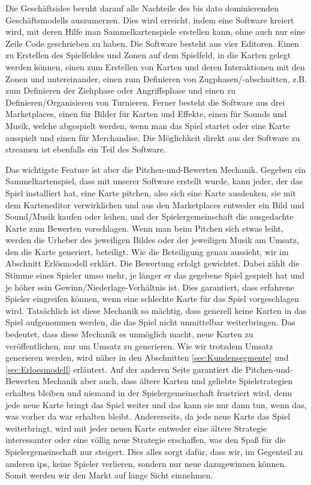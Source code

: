 \documentclass[fontsize=12, a4aper]{scrartcl}
\begin{document}
Die Geschäftsidee beruht darauf alle Nachteile des bis dato dominierenden Geschäftsmodells auszumerzen. Dies wird erreicht, indem eine Software kreiert wird, mit deren Hilfe man Sammelkartenspiele erstellen kann, ohne auch nur eine Zeile Code geschrieben zu haben. Die Software besteht aus vier Editoren. Einen zu Erstellen des Spielfeldes und Zonen auf dem Spielfeld, in die Karten gelegt werden können, einen zum Erstellen von Karten und deren Interaktionen mit den Zonen und untereinander, einen zum Definieren von Zugphasen/-abschnitten, z.B. zum Definieren der Ziehphase oder Angriffsphase und einen zu Definieren/Organisieren von Turnieren. Ferner besteht die Software aus drei Marketplaces, einen für Bilder für Karten und Effekte, einen für Sounds und Musik, welche abgespielt werden, wenn man das Spiel startet oder eine Karte ausspielt und einen für Merchandise. Die Möglichkeit direkt aus der Software zu streamen ist ebenfalls ein Teil des Software.\hfill\newline

\noindent Das wichtigste Feature ist aber die Pitchen-und-Bewerten Mechanik. Gegeben ein Sammelkartenspiel, dass mit unserer Software erstellt wurde, kann jeder, der das Spiel installiert hat, eine Karte pitchen, also sich eine Karte ausdenken, sie mit dem Karteneditor verwirklichen und aus den Marketplaces entweder ein Bild und Sound/Musik kaufen oder leihen, und der Spielergemeinschaft die ausgedachte Karte zum Bewerten vorschlagen. Wenn man beim Pitchen sich etwas leiht, werden die Urheber des jeweiligen Bildes oder der jeweiligen Musik am Umsatz, den die Karte generiert, beteiligt. Wie die Beteiligung genau aussieht, wir im Abschnitt \glqq Erlösmodell\grqq{} erklärt. Die Bewertung erfolgt gewichtet. Dabei zählt die Stimme eines Spieler umso mehr, je länger er das gegebene Spiel gespielt hat und je höher sein Gewinn/Niederlage-Verhältnis ist. Dies garantiert, dass erfahrene Spieler eingreifen können, wenn eine schlechte Karte für das Spiel vorgeschlagen wird. Tatsächlich ist diese Mechanik so mächtig, dass generell keine Karten in das Spiel aufgenommen werden, die das Spiel nicht unmittelbar weiterbringen. Das bedeutet, dass diese Mechanik es unmöglich macht, neue Karten zu veröffentlichen, nur um Umsatz zu generieren. Wie wir trotzdem Umsatz generieren werden, wird näher in den Abschnitten \ref{sec:Kundensegmente} und \ref{sec:Erloesmodell} erläutert. Auf der anderen Seite garantiert die Pitchen-und-Bewerten Mechanik aber auch, dass ältere Karten und geliebte Spielstrategien erhalten bleiben und niemand in der Spielergemeinschaft frustriert wird, denn jede neue Karte bringt das Spiel weiter und das kann sie nur dann tun, wenn das, was vorher da war erhalten bleibt. Andererseits, da jede neue Karte das Spiel weiterbringt, wird mit jeder neuen Karte entweder eine ältere Strategie interessanter oder eine völlig neue Strategie erschaffen, was den Spaß für die Spielergemeinschaft nur steigert. Dies alles sorgt dafür, dass wir, im Gegenteil zu anderen \acp{ip}, keine Spieler verlieren, sondern nur neue dazugewinnen können. Somit werden wir den Markt auf lange Sicht einnehmen.\hfill\newline
\end{document}
